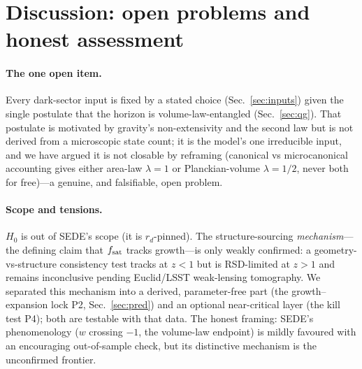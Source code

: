 \section{Discussion: open problems and honest assessment}\label{sec:disc}

\paragraph{The one open item.} Every dark-sector input is fixed by a stated choice
(Sec.~\ref{sec:inputs}) given the single postulate that the horizon is volume-law-entangled
(Sec.~\ref{sec:qg}). That postulate is motivated by gravity's non-extensivity and the second law but is
not derived from a microscopic state count; it is the model's one irreducible input, and we have argued
it is not closable by reframing (canonical vs microcanonical accounting gives either area-law
$\lambda=1$ or Planckian-volume $\lambda=1/2$, never both for free)---a genuine, and falsifiable, open
problem.

\paragraph{Scope and tensions.} $H_0$ is out of SEDE's scope (it is $r_d$-pinned). The
structure-sourcing \emph{mechanism}---the defining claim that $f_{\mathrm{sat}}$ tracks growth---is only weakly
confirmed: a geometry-vs-structure consistency test tracks at $z<1$ but is RSD-limited at $z>1$ and
remains inconclusive pending Euclid/LSST weak-lensing tomography. We separated this mechanism into a
derived, parameter-free part (the growth--expansion lock P2, Sec.~\ref{sec:pred}) and an optional
near-critical layer (the kill test P4); both are testable with that data. The honest framing: SEDE's
phenomenology ($w$ crossing $-1$, the volume-law endpoint) is mildly favoured with an encouraging
out-of-sample check, but its distinctive mechanism is the unconfirmed frontier.


